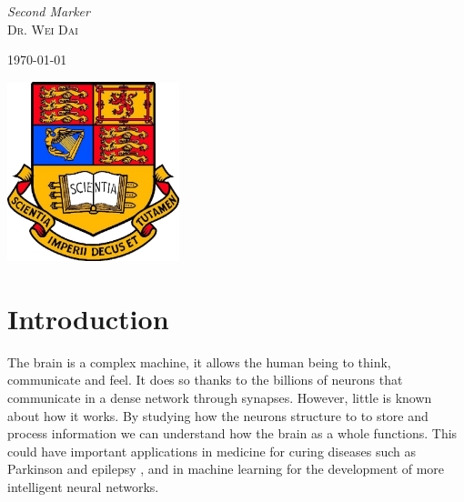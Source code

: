 \documentclass{article}
\begin{document}
\begin{titlepage}
	\vfill
	
	{\large\textit{Second Marker}}\\
	\textsc{Dr. Wei Dai} 
	\vfill\vfill\vfill %
	
	{\large\today} %
	
	
	\vfill\vfill
	 
	\includegraphics[width=5cm]{imperialcollegelondon.jpg}\\[1cm] %
	
	\vfill %
	
\end{titlepage}


\section{Introduction}

The brain is a complex machine, it allows the human being to think, communicate and feel. It does so thanks to the billions of neurons that communicate in a dense network through synapses. However, little is known about how it works. By studying how the neurons structure to to store and process information we can understand how the brain as a whole functions. This could have important applications in medicine for curing diseases such as Parkinson \cite{OldeDubbelinkKimT.E.2014Dbnt} and epilepsy \cite{PONTEN2007918}, and in machine learning for the development of more intelligent neural networks.
\end{document}
